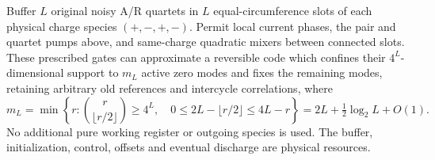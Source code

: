 \begin{proposition}
\label{prop:neutral-buffer-code}
Buffer $L$ original noisy A/R quartets in $L$ equal-circumference
slots of each physical charge species $(+,-,+,-)$. Permit local
current phases, the pair and quartet pumps above, and same-charge
quadratic mixers between connected slots. These prescribed gates
can approximate a reversible code which confines their $4^L$-dimensional
support to $m_L$ active zero modes and fixes the remaining modes,
retaining arbitrary old references and intercycle correlations, where
\begin{equation}
 m_L=\min\left\{r:\binom r{\lfloor r/2\rfloor}\ge4^L,
 \quad0\le2L-\lfloor r/2\rfloor\le4L-r\right\}
 =2L+\tfrac12\log_2L+O(1).
 \label{eq:neutral-buffer-size}
\end{equation}
No additional pure working register or outgoing species is used.
The buffer, initialization, control, offsets and eventual discharge
are physical resources.
\end{proposition}
